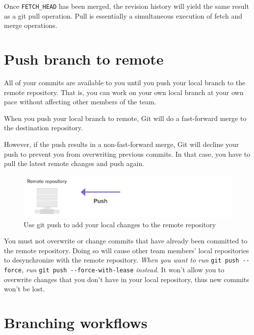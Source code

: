 \documentclass[10pt,a4paper,english]{report}
\begin{document}
    Once \verb|FETCH_HEAD| has been merged, the revision history will yield the same result as a git pull operation. Pull is essentially a simultaneous execution of fetch and merge operations.

\chapter{Push branch to remote}
    \label{chap:push-to-remote}

    All of your commits are available to you until you push your local branch to the remote repository. That is, you can work on your own local branch at your own pace without affecting other members of the team.

    When you push your local branch to remote, Git will do a fast-forward merge to the destination repository.

    However, if the push results in a non-fast-forward merge, Git will decline your push to prevent you from overwriting previous commits. In that case, you have to pull the latest remote changes and push again.

    \begin{figure}[ht]
    \begin{center}
    \includegraphics[scale=0.5]{images/push_branch_to_remote_001.png}
    \end{center}
    \caption{Use git push to add your local changes to the remote repository}
    \end{figure}

    You must not overwrite or change commits that have already been committed to the remote repository. Doing so will cause other team members' local repositories to desynchronize with the remote repository. \emph{When you want to run} \verb|git push --force|\emph{, run }\verb|git push --force-with-lease|\emph{ instead.} It won't allow you to overwrite changes that you don't have in your local repository, thus new commits won't be lost.

\chapter{Branching workflows}
\end{document}
